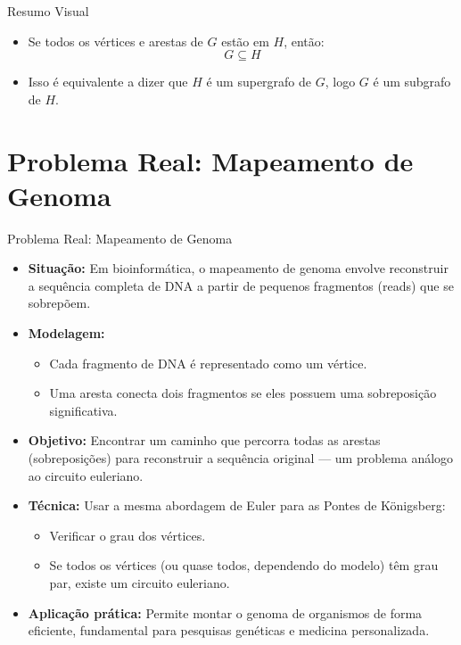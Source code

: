 \documentclass{beamer}
\begin{document}
\begin{frame}{Resumo Visual}
\begin{itemize}
    \item Se todos os vértices e arestas de \(G\) estão em \(H\), então:
    \[
    G \subseteq H
    \]
    \item Isso é equivalente a dizer que \(H\) é um supergrafo de \(G\), logo \(G\) é um subgrafo de \(H\).
\end{itemize}
\end{frame}

\section{Problema Real: Mapeamento de Genoma}

\begin{frame}{Problema Real: Mapeamento de Genoma}
    \begin{itemize}
        \item \textbf{Situação:} Em bioinformática, o mapeamento de genoma envolve reconstruir a sequência completa de DNA a partir de pequenos fragmentos (reads) que se sobrepõem.
        \item \textbf{Modelagem:} 
        \begin{itemize}
            \item Cada fragmento de DNA é representado como um vértice.
            \item Uma aresta conecta dois fragmentos se eles possuem uma sobreposição significativa.
        \end{itemize}
        \item \textbf{Objetivo:} Encontrar um caminho que percorra todas as arestas (sobreposições) para reconstruir a sequência original — um problema análogo ao circuito euleriano.
        \item \textbf{Técnica:} Usar a mesma abordagem de Euler para as Pontes de Königsberg:
        \begin{itemize}
            \item Verificar o grau dos vértices.
            \item Se todos os vértices (ou quase todos, dependendo do modelo) têm grau par, existe um circuito euleriano.
        \end{itemize}
        \item \textbf{Aplicação prática:} Permite montar o genoma de organismos de forma eficiente, fundamental para pesquisas genéticas e medicina personalizada.
    \end{itemize}
\end{frame}
\end{document}
